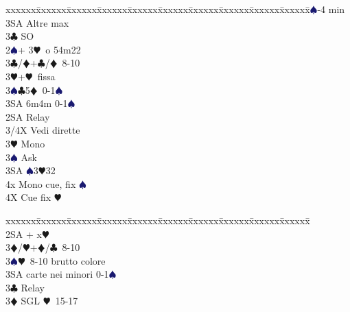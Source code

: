 \documentclass[a4paper,italian]{article}
\newcommand{\BC}{\textcolor{OliveGreen}{$\clubsuit$}}
\newcommand{\BD}{\textcolor{RedOrange}{$\vardiamondsuit$}}
\newcommand{\BH}{\textcolor{Red2}{$\varheartsuit${}}}
\newcommand{\BS}{\textcolor{MidnightBlue}{$\spadesuit${}}}
\newenvironment{bidtable}
{\begin{tabbing}

    xxxxxx\=xxxxxx\=xxxxxx\=xxxxxx\=xxxxxx\=xxxxxx\=xxxxxx\=xxxxxx\=xxxxxx\=xxxxxx\=\kill}
{\end{tabbing} }%
\begin{document}
\begin{multicols}{2}
\begin{bidtable}
                                            3\BS {}-4 min\\
                                            3SA \> Altre max\-\\
                                            3\BC \> SO\-\\
                                            2\BS {}+ 3\BH\ o 54m22\+\\
                                            3\BC/\BD {}+\BC /\BD\ 8-10\\
                                            3\BH {}+\BH\ fissa\\
                                            3\BS {}\BC 5\BD\ 0-1\BS \\
                                            3SA \> 6m4m 0-1\BS \\
                                            2SA \> Relay\+\\
                                            3/4X \> Vedi dirette\\
                                            3\BH \> Mono\+\\
                                            3\BS \> Ask\+\\
                                            3SA \BS 3\BH 32\\
                                            4x \> Mono cue, fix \BS\-\\
                                            4X \> Cue fix \BH \-\-\-\\
                                        \end{bidtable}
                                        \columnbreak
                                        \begin{bidtable}
                                            \+\\
                                            2SA + x\BH \+\\
                                            3\BD/\BH {}+\BD /\BC\ 8-10\\
                                            3\BS {}\BH\ 8-10 brutto colore\\
                                            3SA  carte nei minori 0-1\BS \\
                                            3\BC \> Relay\+\\
                                            3\BD \> SGL \BH\ 15-17\+\\

\end{bidtable}
\end{multicols}
\end{document}
